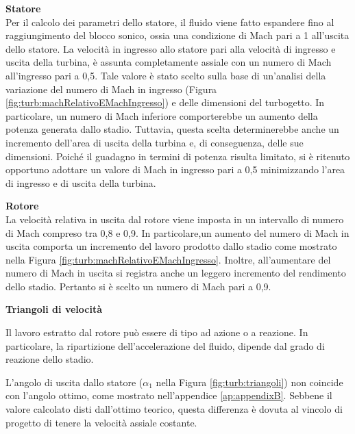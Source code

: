 \textbf{Statore}\\
Per il calcolo dei parametri dello statore, il fluido viene fatto espandere fino al raggiungimento del blocco sonico, ossia una condizione di Mach pari a 1 all'uscita dello statore. La velocità in ingresso allo statore pari alla velocità di ingresso e uscita della turbina, è assunta completamente assiale con un numero di Mach all'ingresso pari a 0,5. Tale valore è stato scelto sulla base di un'analisi della variazione del numero di Mach in ingresso (Figura \ref{fig:turb:machRelativoEMachIngresso}) e delle dimensioni del turbogetto. In particolare,  un numero di Mach inferiore comporterebbe un aumento della potenza generata dallo stadio. Tuttavia, questa scelta determinerebbe anche un incremento dell'area di uscita della turbina e, di conseguenza, delle sue dimensioni. Poiché il guadagno in termini di potenza risulta limitato, si è ritenuto opportuno adottare un valore di Mach in ingresso pari a 0,5 minimizzando l'area di ingresso e di uscita della turbina.

\textbf{Rotore}\\
La velocità relativa in uscita dal rotore viene imposta in un intervallo di numero di Mach compreso tra 0,8 e 0,9. In particolare,un aumento del numero di Mach in uscita comporta un incremento del lavoro prodotto dallo stadio come mostrato nella Figura \ref{fig:turb:machRelativoEMachIngresso}. Inoltre, all'aumentare del numero di Mach in uscita si registra anche un leggero incremento del rendimento dello stadio. Pertanto si è scelto un numero di Mach pari a 0,9. 

\textbf{Triangoli di velocità}

Il lavoro estratto dal rotore può essere di tipo ad azione o a reazione. In particolare, la ripartizione dell'accelerazione del fluido, dipende dal grado di reazione dello stadio.





L'angolo di uscita dallo statore ($\alpha_1$ nella Figura \ref{fig:turb:triangoli}) non coincide con l'angolo ottimo, come mostrato nell'appendice \ref{ap:appendixB}. Sebbene il valore calcolato disti dall'ottimo teorico, questa differenza è dovuta al vincolo di progetto di tenere la velocità assiale costante. 

